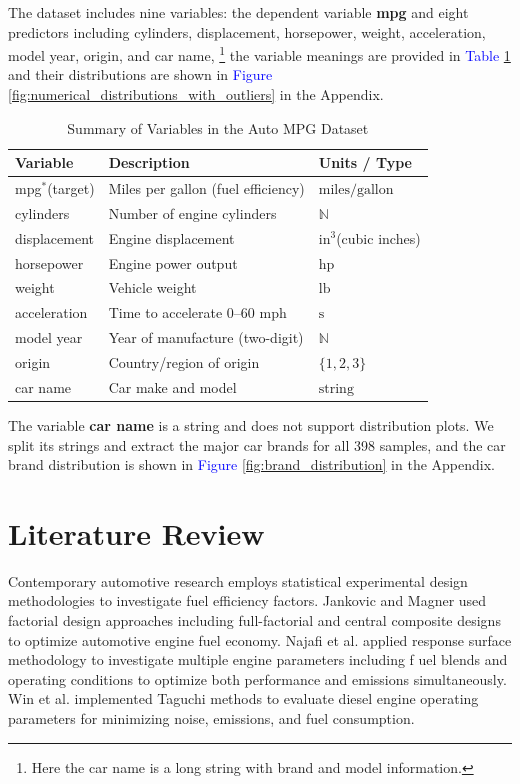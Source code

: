 \documentclass[12pt]{article}
\begin{document}
The dataset includes nine variables: the dependent variable \textbf{mpg} and eight predictors including cylinders, displacement, horsepower, weight, 
acceleration, model year, origin, and car name,
\footnote{Here the car name is a long string with brand and model information.}
the variable meanings are provided in \textcolor{blue}{Table \ref{tab:dataset_summary}} and 
their distributions are shown in \textcolor{blue}{Figure \ref{fig:numerical_distributions_with_outliers}} in the Appendix.

\begin{table}[!h]
\centering
\caption{Summary of Variables in the Auto MPG Dataset}
\label{tab:dataset_summary}
\begin{tabular}{p{3cm}p{7cm}p{3cm}}
\toprule
\textbf{Variable} & \textbf{Description} & \textbf{Units / Type} \\
\midrule
mpg\(^*\)(target) & Miles per gallon (fuel efficiency) & $\text{miles}/\text{gallon}$ \\
cylinders & Number of engine cylinders & $\mathbb{N}$ \\
displacement & Engine displacement & $\text{in}^3$(cubic inches) \\
horsepower & Engine power output & $\text{hp}$ \\
weight & Vehicle weight & $\text{lb}$ \\
acceleration & Time to accelerate 0–60 mph & $\text{s}$ \\
model year & Year of manufacture (two-digit) & $\mathbb{N}$ \\
origin & Country/region of origin & $\{1,2,3\}$ \\
car name & Car make and model & $\text{string}$ \\
\bottomrule
\end{tabular}
\end{table}

The variable \textbf{car name} is a string and does not support distribution plots. We split its strings and extract the major car brands for 
all 398 samples, and the car brand distribution is shown in \textcolor{blue}{Figure \ref{fig:brand_distribution}} in the Appendix.

\section{Literature Review}

Contemporary automotive research employs statistical experimental design methodologies to investigate fuel efficiency factors. Jankovic and Magner \cite{jankovic2006fuel} used 
factorial design approaches including full-factorial and central composite designs to optimize automotive engine fuel economy. 
Najafi et al. \cite{najafi2015response} applied response surface methodology to investigate multiple engine parameters including f
uel blends and operating conditions to optimize both performance and emissions simultaneously. Win et al. \cite{win2005taguchi} 
implemented Taguchi methods to evaluate diesel engine operating parameters for minimizing noise, emissions, and fuel consumption.
\end{document}
